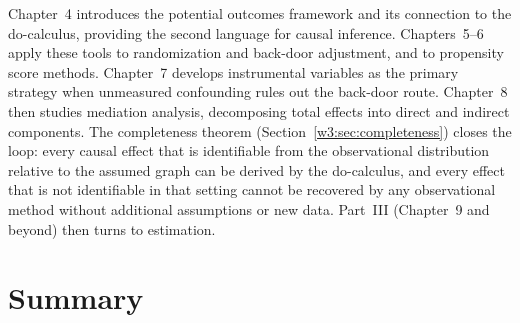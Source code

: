 \documentclass[master.tex]{subfiles}
\begin{document}
\medskip
Chapter~4 introduces the potential outcomes framework and its connection
to the do-calculus, providing the second language for causal inference.
Chapters~5--6 apply these tools to randomization and back-door adjustment,
and to propensity score methods.  Chapter~7 develops instrumental variables
as the primary strategy when unmeasured confounding rules out the back-door
route.  Chapter~8 then studies mediation analysis, decomposing total effects
into direct and indirect components.
The completeness theorem (Section~\ref{w3:sec:completeness}) closes the
loop: every causal effect that is identifiable from the observational
distribution relative to the assumed graph can be derived by the
do-calculus, and every effect that is not identifiable in that setting
cannot be recovered by any observational method without additional
assumptions or new data.  Part~III (Chapter~9 and beyond) then
turns to estimation.

\medskip

\section{Summary}
\label{w3:sec:summary}
\end{document}
